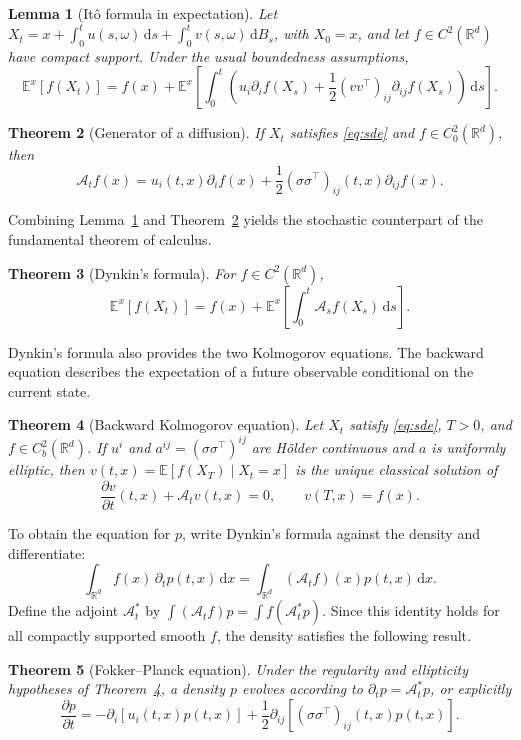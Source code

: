 \documentclass[12pt,a4paper]{report}
\theoremstyle{plain}
\newtheorem{theorem}{Theorem}[chapter]
\newtheorem{lemma}[theorem]{Lemma}
\theoremstyle{definition}
\newcommand{\R}{\mathbb{R}}
\newcommand{\E}{\mathbb{E}}
\newcommand{\dd}{\,\mathrm{d}}
\begin{document}
\begin{lemma}[Itô formula in expectation]\label{lem:ito}
Let $X_t=x+\int_0^t u(s,\omega)\dd s+\int_0^t v(s,\omega)\dd B_s$, with $X_0=x$, and let $f\in C^2(\R^d)$ have compact support. Under the usual boundedness assumptions,
\[\E^x[f(X_t)]=f(x)+\E^x\!\left[\int_0^t\left(u_i\partial_i f(X_s)+\frac12(vv^\top)_{ij}\partial_{ij}f(X_s)\right)\dd s\right].\]
\end{lemma}
\begin{theorem}[Generator of a diffusion]\label{thm:generator}
If $X_t$ satisfies \eqref{eq:sde} and $f\in C_0^2(\R^d)$, then
\begin{equation}\mathcal A_t f(x)=u_i(t,x)\partial_i f(x)+\frac12(\sigma\sigma^\top)_{ij}(t,x)\partial_{ij}f(x).\label{eq:generator}\end{equation}
\end{theorem}
Combining Lemma~\ref{lem:ito} and Theorem~\ref{thm:generator} yields the stochastic counterpart of the fundamental theorem of calculus.
\begin{theorem}[Dynkin's formula]\label{thm:dynkin}
For $f\in C^2(\R^d)$,
\begin{equation}\E^x[f(X_t)]=f(x)+\E^x\!\left[\int_0^t\mathcal A_s f(X_s)\dd s\right].\label{eq:dynkin}\end{equation}
\end{theorem}
Dynkin's formula also provides the two Kolmogorov equations. The backward equation describes the expectation of a future observable conditional on the current state.
\begin{theorem}[Backward Kolmogorov equation]\label{thm:backward}
Let $X_t$ satisfy \eqref{eq:sde}, $T>0$, and $f\in C_b^2(\R^d)$. If $u^i$ and $a^{ij}=(\sigma\sigma^\top)^{ij}$ are Hölder continuous and $a$ is uniformly elliptic, then $v(t,x)=\E[f(X_T)\mid X_t=x]$ is the unique classical solution of
\[\frac{\partial v}{\partial t}(t,x)+\mathcal A_t v(t,x)=0,\qquad v(T,x)=f(x).\]
\end{theorem}
To obtain the equation for $p$, write Dynkin's formula against the density and differentiate:
\[\int_{\R^d}f(x)\,\partial_t p(t,x)\dd x=\int_{\R^d}(\mathcal A_t f)(x)p(t,x)\dd x.\]
Define the adjoint $\mathcal A_t^*$ by $\int(\mathcal A_t f)p=\int f(\mathcal A_t^*p)$. Since this identity holds for all compactly supported smooth $f$, the density satisfies the following result.
\begin{theorem}[Fokker--Planck equation]\label{thm:fp}
Under the regularity and ellipticity hypotheses of Theorem~\ref{thm:backward}, a density $p$ evolves according to $\partial_t p=\mathcal A_t^*p$, or explicitly
\begin{equation}\frac{\partial p}{\partial t}=-\partial_i[u_i(t,x)p(t,x)]+\frac12\partial_{ij}\left[(\sigma\sigma^\top)_{ij}(t,x)p(t,x)\right].\label{eq:fp}\end{equation}
\end{theorem}
\end{document}
